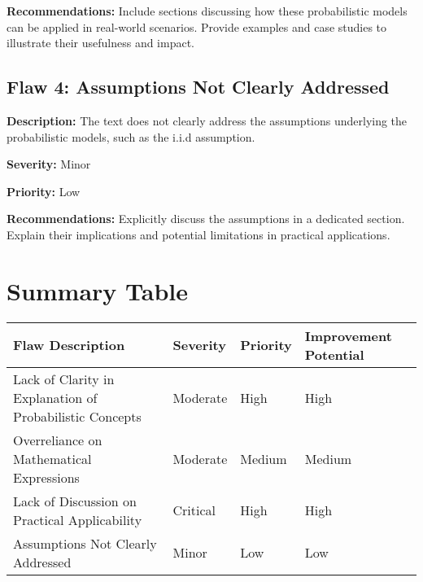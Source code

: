 \documentclass{article}
\begin{document}
\textbf{Recommendations:} 
Include sections discussing how these probabilistic models can be applied in real-world scenarios. Provide examples and case studies to illustrate their usefulness and impact.

\subsection*{Flaw 4: Assumptions Not Clearly Addressed}

\textbf{Description:} 
The text does not clearly address the assumptions underlying the probabilistic models, such as the i.i.d assumption.

\textbf{Severity:} 
Minor

\textbf{Priority:} 
Low

\textbf{Recommendations:} 
Explicitly discuss the assumptions in a dedicated section. Explain their implications and potential limitations in practical applications.

\section*{Summary Table}

\begin{longtable}{|p{5cm}|p{2cm}|p{2cm}|p{3cm}|}
\hline
\textbf{Flaw Description} & \textbf{Severity} & \textbf{Priority} & \textbf{Improvement Potential} \\
\hline
Lack of Clarity in Explanation of Probabilistic Concepts & Moderate & High & High \\
\hline
Overreliance on Mathematical Expressions & Moderate & Medium & Medium \\
\hline
Lack of Discussion on Practical Applicability & Critical & High & High \\
\hline
Assumptions Not Clearly Addressed & Minor & Low & Low \\
\hline
\end{longtable}
\end{document}
